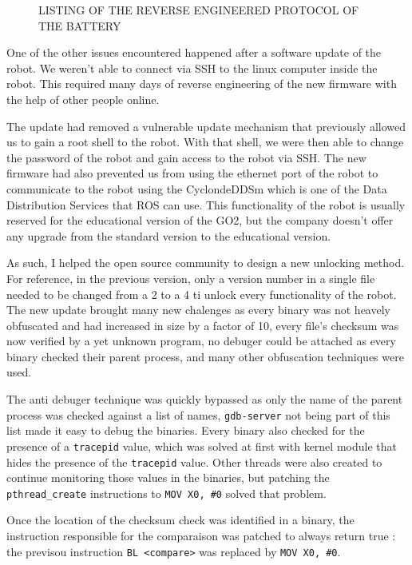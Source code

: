 \documentclass[11pt]{article}
\begin{document}
            \begin{figure}[H]
                \centering
                \color{red}LISTING OF THE REVERSE ENGINEERED PROTOCOL OF THE BATTERY
            \end{figure}

            One of the other issues encountered happened after a software update of the robot. We weren't able to connect via SSH to the linux computer inside the robot. This required many days of reverse engineering of the new firmware with the help of other people online.

            The update had removed a vulnerable update mechanism that previously allowed us to gain a root shell to the robot. With that shell, we were then able to change the password of the robot and gain access to the robot via SSH. The new firmware had also prevented us from using the ethernet port of the robot to communicate to the robot using the CyclondeDDSm which is one of the Data Distribution Services that ROS can use. This functionality of the robot is usually reserved for the educational version of the GO2, but the company doesn't offer any upgrade from the standard version to the educational version.

            As such, I helped the open source community to design a new unlocking method. For reference, in the previous version, only a version number in a single file needed to be changed from a 2 to a 4 ti unlock every functionality of the robot. The new update brought many new chalenges as every binary was not heavely obfuscated and had increased in size by a factor of 10, every file's checksum was now verified by a yet unknown program, no debuger could be attached as every binary checked their parent process, and many other obfuscation techniques were used.

            The anti debuger technique was quickly bypassed as only the name of the parent process was checked against a list of names, \texttt{gdb-server} not being part of this list made it easy to debug the binaries. Every binary also checked for the presence of a \texttt{tracepid} value, which was solved at first with kernel module that hides the presence of the \texttt{tracepid} value. Other threads were also created to continue monitoring those values in the binaries, but patching the \texttt{pthread\_create} instructions to \texttt{MOV X0, \#0} solved that problem.

            Once the location of the checksum check was identified in a binary, the instruction responsible for the comparaison was patched to always return true : the previsou instruction \texttt{BL <compare>} was replaced by \texttt{MOV X0, \#0}.
\end{document}
